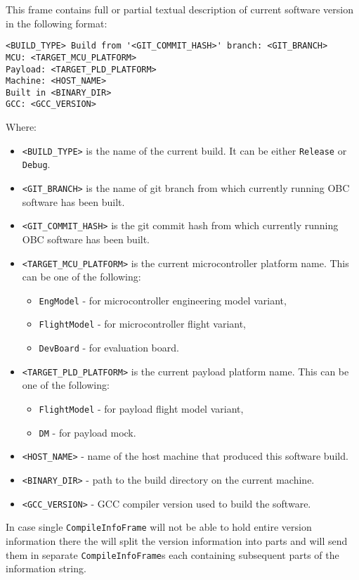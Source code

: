 This frame contains full or partial textual description of current \obc software version in the following format:\bigskip\\
\begin{verbatim}
<BUILD_TYPE> Build from '<GIT_COMMIT_HASH>' branch: <GIT_BRANCH>
MCU: <TARGET_MCU_PLATFORM>
Payload: <TARGET_PLD_PLATFORM>
Machine: <HOST_NAME>
Built in <BINARY_DIR>
GCC: <GCC_VERSION>
\end{verbatim}
Where:
\begin{itemize}
	\item \texttt{<BUILD_TYPE>} is the name of the current build. It can be either \texttt{Release} or \texttt{Debug}.
	\item \texttt{<GIT_BRANCH>} is the name of git branch from which currently running OBC software has been built.
	\item \texttt{<GIT_COMMIT_HASH>} is the git commit hash from which currently running OBC software has been built.
	\item \texttt{<TARGET_MCU_PLATFORM>} is the current microcontroller platform name. This can be one of the following: 
	\begin{itemize}
		\item \texttt{EngModel} - for microcontroller engineering model variant,
		\item \texttt{FlightModel} - for microcontroller flight variant,
		\item \texttt{DevBoard} - for evaluation board.
	\end{itemize}
	\item \texttt{<TARGET_PLD_PLATFORM>} is the current payload platform name. This can be one of the following: 
	\begin{itemize}
		\item \texttt{FlightModel} - for payload flight model variant,
		\item \texttt{DM} - for payload mock.
	\end{itemize}
	\item \texttt{<HOST_NAME>} - name of the host machine that produced this \obc software build.
	\item \texttt{<BINARY_DIR>} - path to the build directory on the current machine.
	\item \texttt{<GCC_VERSION>} - GCC compiler version used to build the \obc software.
\end{itemize}

In case single \texttt{CompileInfoFrame} will not be able to hold entire version information there the \obc will split the version information into parts and will send them in separate \texttt{CompileInfoFrame}s each containing subsequent parts of the information string. 

